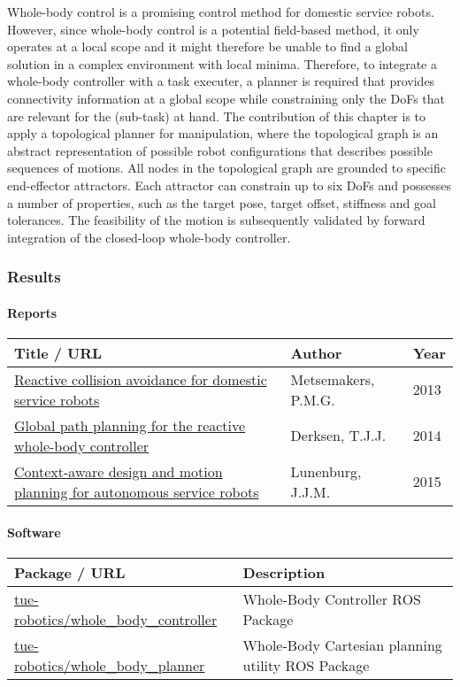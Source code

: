 Whole-body control is a promising control method for domestic service robots. However, since whole-body control is a potential field-based method, it only operates at a local scope and it might therefore be unable to find a global solution in a complex environment with local minima. Therefore, to integrate a whole-body controller with a task executer, a planner is required that
provides connectivity information at a global scope while constraining only the DoFs that are relevant for the (sub-task) at hand.
The contribution of this chapter is to apply a topological planner for manipulation, where the topological graph is an abstract representation of possible robot configurations that describes possible sequences of motions.
All nodes in the topological graph are grounded to specific end-effector attractors. Each attractor can constrain up to six DoFs and possesses a number of properties, such as the target pose, target offset, stiffness and goal tolerances. The feasibility of the motion is subsequently validated by forward integration of the closed-loop whole-body controller.

\subsubsection{Results}

\paragraph{Reports}
\begin{longtable}{|p{8.5cm}p{4cm}p{2cm}|}
\hline
\rowcolor[gray]{0.8} \bf Title / URL & \bf Author & \bf Year \\
\hline
\href{http://repository.tue.nl/762360}{Reactive collision avoidance for domestic service robots} & Metsemakers, P.M.G. & 2013 \\
\href{http://repository.tue.nl/778410}{Global path planning for the reactive whole-body controller} & Derksen, T.J.J. & 2014 \\
\href{http://repository.tue.nl/794842}{Context-aware design and motion planning for autonomous service robots} & Lunenburg, J.J.M. & 2015 \\
\hline
\end{longtable}

\paragraph{Software}
\begin{longtable}{|p{6cm}p{9cm}|}
\hline
\rowcolor[gray]{0.8} \bf Package / URL & \bf Description\\
\hline
\href{https://github.com/tue-robotics/amigo_whole_body_controller}{tue-robotics/whole\_body\_controller} & Whole-Body Controller ROS Package \\
\href{https://github.com/tue-robotics/whole_body_planner}{tue-robotics/whole\_body\_planner} & Whole-Body Cartesian planning utility ROS Package \\
\hline
\end{longtable}

